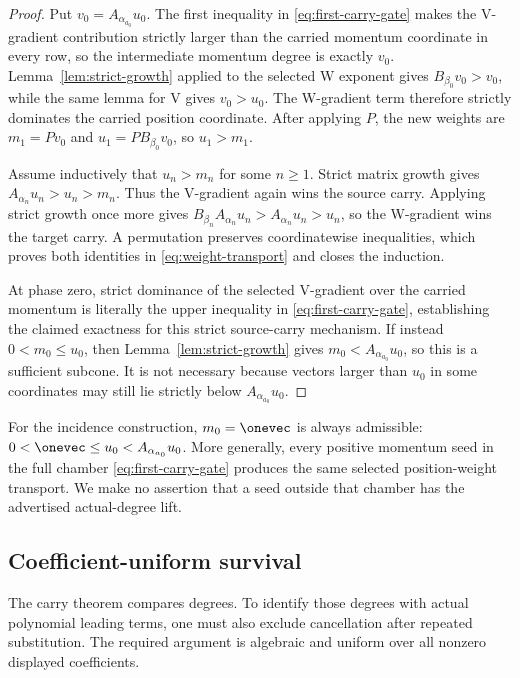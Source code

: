 \documentclass[11pt,letterpaper]{article}
\theoremstyle{definition}
\theoremstyle{remark}
\numberwithin{equation}{section}
\begin{document}
\begin{proof}
Put \(v_0=A_{\alpha_{a_0}}u_0\).  The first inequality in
\eqref{eq:first-carry-gate} makes the V-gradient contribution strictly larger
than the carried momentum coordinate in every row, so the intermediate
momentum degree is exactly \(v_0\).  Lemma~\ref{lem:strict-growth} applied to
the selected W exponent gives \(B_{\beta_0}v_0>v_0\), while the same lemma
for V gives \(v_0>u_0\).  The W-gradient term therefore strictly dominates
the carried position coordinate.  After applying \(P\), the new weights are
\(m_1=Pv_0\) and \(u_1=PB_{\beta_0}v_0\), so \(u_1>m_1\).

Assume inductively that \(u_n>m_n\) for some \(n\geq1\).  Strict matrix
growth gives \(A_{\alpha_n}u_n>u_n>m_n\).  Thus the V-gradient again wins
the source carry.  Applying strict growth once more gives
\(B_{\beta_n}A_{\alpha_n}u_n>A_{\alpha_n}u_n>u_n\), so the W-gradient wins
the target carry.  A permutation preserves coordinatewise inequalities,
which proves both identities in \eqref{eq:weight-transport} and closes the
induction.

At phase zero, strict dominance of the selected V-gradient over the carried
momentum is literally the upper inequality in
\eqref{eq:first-carry-gate}, establishing the claimed exactness for this
strict source-carry mechanism.  If instead \(0<m_0\leq u_0\), then
Lemma~\ref{lem:strict-growth} gives \(m_0<A_{\alpha_{a_0}}u_0\), so this is
a sufficient subcone.  It is not necessary because vectors larger than
\(u_0\) in some coordinates may still lie strictly below
\(A_{\alpha_{a_0}}u_0\).
\end{proof}

For the incidence construction, \(m_0=\onevec\) is always admissible:
\(0<\onevec\leq u_0<A_{\alpha_{a_0}}u_0\).  More generally, every positive
momentum seed in the full chamber \eqref{eq:first-carry-gate} produces the
same selected position-weight transport.  We make no assertion that a seed
outside that chamber has the advertised actual-degree lift.

\subsection{Coefficient-uniform survival}

The carry theorem compares degrees.  To identify those degrees with actual
polynomial leading terms, one must also exclude cancellation after repeated
substitution.  The required argument is algebraic and uniform over all
nonzero displayed coefficients.
\end{document}
